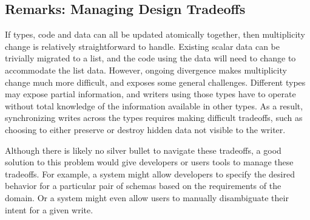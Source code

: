 \documentclass[english,submission]{programming}
\begin{document}
\subsection*{Remarks: Managing Design Tradeoffs}

If types, code and data can all be updated atomically together, then multiplicity change is
relatively straightforward  to handle. Existing scalar data can be trivially migrated to a
list, and the code using the data will need to change to accommodate the list data.
%
However, ongoing divergence makes multiplicity change much more difficult, and exposes
some general challenges. Different types may expose partial information, and writers using
those types have to operate without total knowledge of the information available in other types.
As a result, synchronizing writes across the types requires making difficult tradeoffs, such as
choosing to either preserve or destroy hidden data not visible to the writer.

Although there is likely no silver bullet to navigate these tradeoffs, a good solution to this
problem would give developers or users tools to manage these tradeoffs. For example, a system
might allow developers to specify the desired behavior for a particular pair of schemas based
on the requirements of the domain. Or a system might even allow users to manually
disambiguate their intent for a given write.

\end{document}
